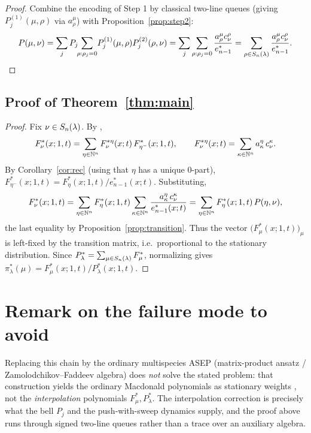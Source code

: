 \begin{proof}
Combine the encoding of Step 1 by classical two-line queues
\cite[Lem.~5.4]{AMW25} (giving $P^{(1)}_j(\mu,\rho)$ via $a^\mu_\rho$) with
Proposition~\ref{prop:step2}:
\[
P(\mu,\nu)=\sum_j P_j\!\!\sum_{\rho:\rho_j=0}\!P^{(1)}_j(\mu,\rho)P^{(2)}_j(\rho,\nu)
=\sum_j\sum_{\rho:\rho_j=0}\frac{a^\mu_\rho c^\rho_\nu}{e^*_{n-1}}
=\sum_{\rho\in S_n(\lambda)}\frac{a^\mu_\rho c^\rho_\nu}{e^*_{n-1}}.
\]
\end{proof}

\subsection*{Proof of Theorem~\ref{thm:main}}

\begin{proof}
Fix $\nu\in S_n(\lambda)$. By \cite[Thm.~1.15, Lem.~5.6]{BDW25a},
\[
F^*_\nu(x;1,t)=\sum_{\eta\in\mathbb{N}^n}F^{*\eta}_\nu(x;t)\,F^*_{\eta^-}(x;1,t),
\qquad
F^{*\eta}_\nu(x;t)=\sum_{\kappa\in\mathbb{N}^n}a^\eta_\kappa\,c^\kappa_\nu .
\]
By Corollary~\ref{cor:rec} (using that $\eta$ has a unique $0$-part),
$F^*_{\eta^-}(x;1,t)=F^*_\eta(x;1,t)/e^*_{n-1}(x;t)$. Substituting,
\[
F^*_\nu(x;1,t)=\sum_{\eta\in\mathbb{N}^n}F^*_\eta(x;1,t)\sum_{\kappa\in\mathbb{N}^n}
\frac{a^\eta_\kappa\,c^\kappa_\nu}{e^*_{n-1}(x;t)}
=\sum_{\eta\in\mathbb{N}^n}F^*_\eta(x;1,t)\,P(\eta,\nu),
\]
the last equality by Proposition~\ref{prop:transition}. Thus the vector
$\bigl(F^*_\mu(x;1,t)\bigr)_\mu$ is left-fixed by the transition matrix, i.e.\
proportional to the stationary distribution. Since
$P^*_\lambda=\sum_{\mu\in S_n(\lambda)}F^*_\mu$, normalizing gives
$\pi^*_\lambda(\mu)=F^*_\mu(x;1,t)/P^*_\lambda(x;1,t)$.
\end{proof}

\section*{Remark on the failure mode to avoid}

Replacing this chain by the ordinary multispecies ASEP (matrix-product ansatz /
Zamolodchikov--Faddeev algebra) does \emph{not} solve the stated problem: that
construction yields the ordinary Macdonald polynomials as stationary weights
\cite{CMW22,AMW25}, not the \emph{interpolation} polynomials $F^*_\mu,P^*_\lambda$.
The interpolation correction is precisely what the bell $P_j$ and the
push-with-sweep dynamics supply, and the proof above runs through signed
two-line queues rather than a trace over an auxiliary algebra.

